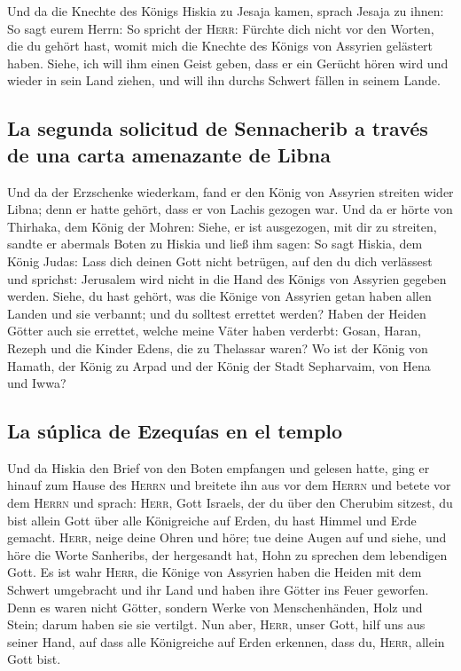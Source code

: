  Und da die Knechte des Königs Hiskia zu Jesaja kamen,
 sprach Jesaja zu ihnen: So sagt eurem Herrn: So spricht
der \textsc{Herr}: Fürchte dich nicht vor den Worten, die du gehört
hast, womit mich die Knechte des Königs von Assyrien gelästert haben.
 Siehe, ich will ihm einen Geist geben, dass er ein
Gerücht hören wird und wieder in sein Land ziehen, und will ihn durchs
Schwert fällen in seinem Lande.

\hypertarget{la-segunda-solicitud-de-sennacherib-a-travuxe9s-de-una-carta-amenazante-de-libna}{%
\subsection{La segunda solicitud de Sennacherib a través de una carta
amenazante de
Libna}\label{la-segunda-solicitud-de-sennacherib-a-travuxe9s-de-una-carta-amenazante-de-libna}}

 Und da der Erzschenke wiederkam, fand er den König von
Assyrien streiten wider Libna; denn er hatte gehört, dass er von Lachis
gezogen war.  Und da er hörte von Thirhaka, dem König der
Mohren: Siehe, er ist ausgezogen, mit dir zu streiten, sandte er
abermals Boten zu Hiskia und ließ ihm sagen:  So sagt
Hiskia, dem König Judas: Lass dich deinen Gott nicht betrügen, auf den
du dich verlässest und sprichst: Jerusalem wird nicht in die Hand des
Königs von Assyrien gegeben werden.  Siehe, du hast
gehört, was die Könige von Assyrien getan haben allen Landen und sie
verbannt; und du solltest errettet werden?  Haben der
Heiden Götter auch sie errettet, welche meine Väter haben verderbt:
Gosan, Haran, Rezeph und die Kinder Edens, die zu Thelassar waren?
 Wo ist der König von Hamath, der König zu Arpad und der
König der Stadt Sepharvaim, von Hena und Iwwa?

\hypertarget{la-suxfaplica-de-ezequuxedas-en-el-templo}{%
\subsection{La súplica de Ezequías en el
templo}\label{la-suxfaplica-de-ezequuxedas-en-el-templo}}

 Und da Hiskia den Brief von den Boten empfangen und
gelesen hatte, ging er hinauf zum Hause des \textsc{Herrn} und breitete
ihn aus vor dem \textsc{Herrn}  und betete vor dem
\textsc{Herrn} und sprach: \textsc{Herr}, Gott Israels, der du über den
Cherubim sitzest, du bist allein Gott über alle Königreiche auf Erden,
du hast Himmel und Erde gemacht.  \textsc{Herr}, neige
deine Ohren und höre; tue deine Augen auf und siehe, und höre die Worte
Sanheribs, der hergesandt hat, Hohn zu sprechen dem lebendigen Gott.
 Es ist wahr \textsc{Herr}, die Könige von Assyrien haben
die Heiden mit dem Schwert umgebracht und ihr Land  und
haben ihre Götter ins Feuer geworfen. Denn es waren nicht Götter,
sondern Werke von Menschenhänden, Holz und Stein; darum haben sie sie
vertilgt.  Nun aber, \textsc{Herr}, unser Gott, hilf uns
aus seiner Hand, auf dass alle Königreiche auf Erden erkennen, dass du,
\textsc{Herr}, allein Gott bist.

